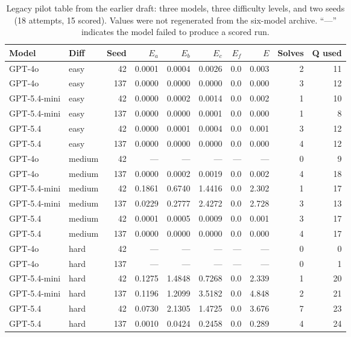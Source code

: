 \begin{table}[htbp]
\centering
\caption{Legacy pilot table from the earlier draft: three models, three difficulty levels, and two seeds (18 attempts, 15 scored). Values were not regenerated from the six-model archive.
``---'' indicates the model failed to produce a scored run.}\label{tab:pilot}
\scriptsize
\setlength{\tabcolsep}{4pt}
\begin{tabular}{llrrrrrrrr}
\toprule
\textbf{Model} & \textbf{Diff} & \textbf{Seed} & $E_a$ & $E_b$ & $E_c$
    & $E_f$ & $E$ & \textbf{Solves} & \textbf{Q used} \\
\midrule
GPT-4o       & easy   & 42  & 0.0001 & 0.0004 & 0.0026 & 0.0  & 0.003  & 2 & 11 \\
GPT-4o       & easy   & 137 & 0.0000 & 0.0000 & 0.0000 & 0.0  & 0.000  & 3 & 12 \\
GPT-5.4-mini & easy   & 42  & 0.0000 & 0.0002 & 0.0014 & 0.0  & 0.002  & 1 & 10 \\
GPT-5.4-mini & easy   & 137 & 0.0000 & 0.0000 & 0.0001 & 0.0  & 0.000  & 1 &  8 \\
GPT-5.4      & easy   & 42  & 0.0000 & 0.0001 & 0.0004 & 0.0  & 0.001  & 3 & 12 \\
GPT-5.4      & easy   & 137 & 0.0000 & 0.0000 & 0.0000 & 0.0  & 0.000  & 4 & 12 \\
\midrule
GPT-4o       & medium & 42  & ---    & ---    & ---    & ---  & ---    & 0 &  9 \\
GPT-4o       & medium & 137 & 0.0000 & 0.0002 & 0.0019 & 0.0  & 0.002  & 4 & 18 \\
GPT-5.4-mini & medium & 42  & 0.1861 & 0.6740 & 1.4416 & 0.0  & 2.302  & 1 & 17 \\
GPT-5.4-mini & medium & 137 & 0.0229 & 0.2777 & 2.4272 & 0.0  & 2.728  & 3 & 13 \\
GPT-5.4      & medium & 42  & 0.0001 & 0.0005 & 0.0009 & 0.0  & 0.001  & 3 & 17 \\
GPT-5.4      & medium & 137 & 0.0000 & 0.0000 & 0.0000 & 0.0  & 0.000  & 4 & 17 \\
\midrule
GPT-4o       & hard   & 42  & ---    & ---    & ---    & ---  & ---    & 0 &  0 \\
GPT-4o       & hard   & 137 & ---    & ---    & ---    & ---  & ---    & 0 &  1 \\
GPT-5.4-mini & hard   & 42  & 0.1275 & 1.4848 & 0.7268 & 0.0  & 2.339  & 1 & 20 \\
GPT-5.4-mini & hard   & 137 & 0.1196 & 1.2099 & 3.5182 & 0.0  & 4.848  & 2 & 21 \\
GPT-5.4      & hard   & 42  & 0.0730 & 2.1305 & 1.4725 & 0.0  & 3.676  & 7 & 23 \\
GPT-5.4      & hard   & 137 & 0.0010 & 0.0424 & 0.2458 & 0.0  & 0.289  & 4 & 24 \\
\bottomrule
\end{tabular}
\end{table}

